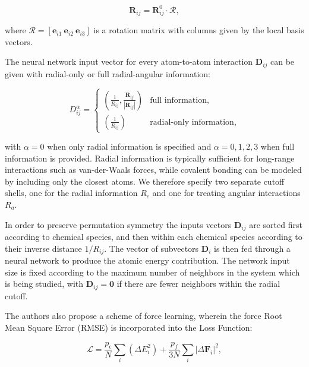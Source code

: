 \begin{equation}
    \bm{R}_{ij} = \bm{R}_{ij}^0 \cdot \mathcal{R} ,
\end{equation}

where $\mathcal{R} = [\bm{e}_{i1} \ \bm{e}_{i2} \ \bm{e}_{i3}]$
is a rotation matrix with columns given by the local basis vectors.
\par
The neural network input vector for every atom-to-atom interaction
$\bm{D}_{ij}$ can be given with radial-only or full radial-angular
information:

\begin{equation}
    D_{ij}^{\alpha} =
\begin{cases}
    \left( \frac{1}{R_{ij}}, \frac{\bm{R}_{ij}}{\left| \bm{R}_{ij} \right|}
    \right) & \text{full information}, \\
    \left( \frac{1}{R_{ij}} \right) & \text{radial-only information},
\end{cases}
\end{equation}

with $\alpha = 0$ when only radial information is specified
and $\alpha = 0,1,2,3$ when full information is provided. Radial information
is typically sufficient for long-range interactions such as van-der-Waals
forces, while covalent bonding can be modeled by including
only the closest atoms. We therefore specify two separate
cutoff shells, one for the radial information $R_c$ and one
for treating angular interactions $R_a$.
\par
In order to preserve permutation symmetry the inputs vectors $\bm{D}_{ij}$
are sorted first according to chemical species, and then within
each chemical species according to their inverse distance $1 / R_{ij}$.
The vector of subvectors $\bm{D}_i$ is then fed through a neural
network to produce the atomic energy contribution.
The network input size is fixed according to the maximum number of neighbors
in the system which is being studied, with $\bm{D}_{ij} = \bm{0}$
if there are fewer neighbors within the radial cutoff.
\par
The authors also propose a scheme of force learning, wherein
the force Root Mean Square Error (RMSE) is incorporated into the Loss Function:

\begin{equation}
    \mathcal{L} = \frac{p_{\epsilon}}{N} \sum_i
    \left( \Delta E_i^2 \right)
    + \frac{p_{f}}{3N} \sum_i \left| \Delta \bm{F}_i \right|^2,
\end{equation}

